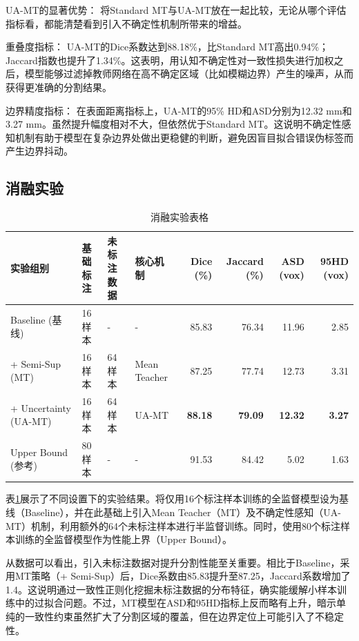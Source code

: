 \documentclass{xduugthesis}
\begin{document}
UA-MT的显著优势： 将Standard MT与UA-MT放在一起比较，无论从哪个评估指标看，都能清楚看到引入不确定性机制所带来的增益。

重叠度指标： UA-MT的Dice系数达到88.18\%，比Standard MT高出0.94\%；Jaccard指数也提升了1.34\%。这表明，用认知不确定性对一致性损失进行加权之后，模型能够过滤掉教师网络在高不确定区域（比如模糊边界）产生的噪声，从而获得更准确的分割结果。

边界精度指标： 在表面距离指标上，UA-MT的95\% HD和ASD分别为12.32 mm和3.27 mm。虽然提升幅度相对不大，但依然优于Standard MT。这说明不确定性感知机制有助于模型在复杂边界处做出更稳健的判断，避免因盲目拟合错误伪标签而产生边界抖动。

\subsection{消融实验}
\begin{table}[htbp]
  \centering
  \caption{消融实验表格}
  \label{tab:exp_results_fullborder}
  
  \begin{tabular}{|l|l|l|l|r|r|r|r|}
    \hline 
    \textbf{实验组别} & \textbf{基础标注} & \textbf{未标注数据} & \textbf{核心机制} & \textbf{Dice (\%)} & \textbf{Jaccard (\%)} & \textbf{ASD (vox)} & \textbf{95HD (vox)} \\
    \hline 
    Baseline (基线) & 16 样本 & - & - & 85.83 & 76.34 & 11.96 & 2.85 \\
    \hline 
    + Semi-Sup (MT) & 16 样本 & 64 样本 & Mean Teacher & 87.25 & 77.74 & 12.73 & 3.31 \\
    \hline 
    + Uncertainty (UA-MT) & 16 样本 & 64 样本 & UA-MT  & \textbf{88.18} & \textbf{79.09} & \textbf{12.32} & \textbf{3.27} \\
    \hline 
    Upper Bound (参考) & 80 样本 & - & - & 91.53 & 84.42 & 5.02 & 1.63 \\
    \hline 
  \end{tabular}
\end{table}

表\ref{tab:exp_results_fullborder}展示了不同设置下的实验结果。将仅用16个标注样本训练的全监督模型设为基线（Baseline），并在此基础上引入Mean Teacher（MT）及不确定性感知（UA-MT）机制，利用额外的64个未标注样本进行半监督训练。同时，使用80个标注样本训练的全监督模型作为性能上界（Upper Bound）。

从数据可以看出，引入未标注数据对提升分割性能至关重要。相比于Baseline，采用MT策略（+ Semi-Sup）后，Dice系数由85.83提升至87.25，Jaccard系数增加了1.4。这说明通过一致性正则化挖掘未标注数据的分布特征，确实能缓解小样本训练中的过拟合问题。不过，MT模型在ASD和95HD指标上反而略有上升，暗示单纯的一致性约束虽然扩大了分割区域的覆盖，但在边界定位上可能引入了不稳定性。
\end{document}
